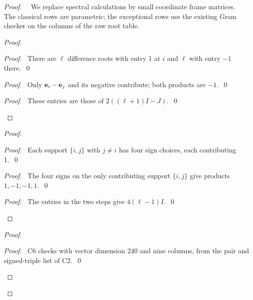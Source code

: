 \begin{proof}
 \pfsketch\ \new\ We replace spectral calculations by small coordinate frame
 matrices. The classical rows are parametric; the exceptional rows use the
 existing Gram checker on the columns of the raw root table.
 \begin{proof}
  \begin{proof}\pf\ There are $\ell$ difference roots with entry 1 at $i$ and
   $\ell$ with entry $-1$ there.~\qed\end{proof}
  \begin{proof}\pf\ Only ${\mathbf e}_i-{\mathbf e}_j$ and its negative contribute; both products are $-1$.~\qed\end{proof}
  \qedstep
  \begin{proof}\pf\ These entries are those of $2((\ell+1)I-J)$.~\qed\end{proof}
 \end{proof}
 \begin{proof}
  \begin{proof}\pf\ Each support $\{i,j\}$ with $j\ne i$ has four sign choices, each contributing 1.~\qed\end{proof}
  \begin{proof}\pf\ The four signs on the only contributing support $\{i,j\}$
   give products $1,-1,-1,1$.~\qed\end{proof}
  \qedstep
  \begin{proof}\pf\ The entries in the two steps give $4(\ell-1)I$.~\qed\end{proof}
 \end{proof}
 \begin{proof}
  \begin{proof}\pf\ C6 checks  with vector
   dimension 240 and nine columns, from the pair and signed-triple list of C2.~\qed\end{proof}

\end{proof}
\end{proof}
